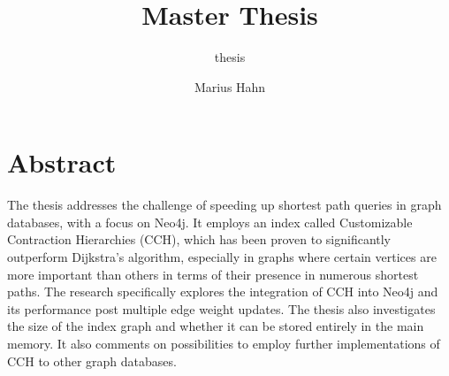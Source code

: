 \documentclass[11pt, rgb]{scrreprt}
\author{Marius Hahn}
\title{Master Thesis}
\subtitle{thesis}
\begin{document}

\chapter*{Abstract}

The thesis addresses the challenge of speeding up shortest path queries in graph databases, with a focus on Neo4j. 
It employs an index called Customizable Contraction Hierarchies (CCH), which has been proven to significantly outperform Dijkstra's algorithm, especially in graphs where certain vertices are more important than others in terms of their presence in numerous shortest paths. 
The research specifically explores the integration of CCH into Neo4j and its performance post multiple edge weight updates.
The thesis also investigates the size of the index graph and whether it can be stored entirely in the main memory.
It also comments on possibilities to employ further implementations of CCH to other graph databases.
\tableofcontents



%

\rmfamily 
\normalsize











\end{document}
